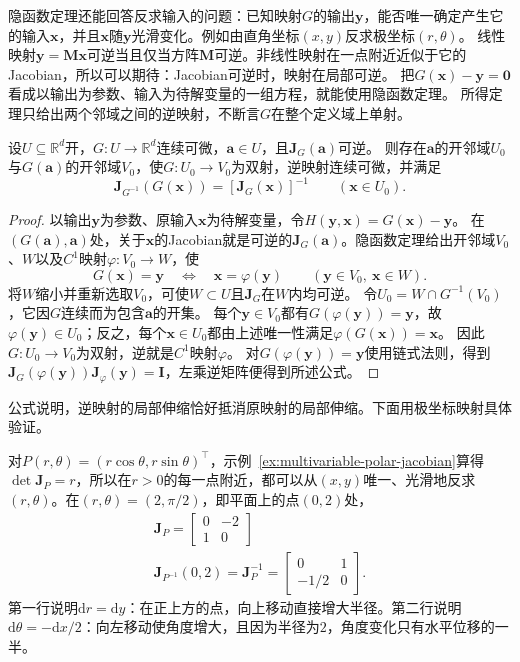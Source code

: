 隐函数定理还能回答反求输入的问题：已知映射$G$的输出$\bm y$，能否唯一确定产生它的输入$\bm x$，并且$\bm x$随$\bm y$光滑变化。例如由直角坐标$(x,y)$反求极坐标$(r,\theta)$。
线性映射$\bm y=\bm M\bm x$可逆当且仅当方阵$\bm M$可逆。非线性映射在一点附近近似于它的Jacobian，所以可以期待：Jacobian可逆时，映射在局部可逆。
把$G(\bm x)-\bm y=\bm 0$看成以输出为参数、输入为待解变量的一组方程，就能使用隐函数定理。
所得定理只给出两个邻域之间的逆映射，不断言$G$在整个定义域上单射。
\begin{theorem}[局部反函数定理]
\label{thm:multivariable-inverse-function}
设$U\subseteq\mathbb R^d$开，$G:U\to\mathbb R^d$连续可微，$\bm a\in U$，且$\bm J_G(\bm a)$可逆。
则存在$\bm a$的开邻域$U_0$与$G(\bm a)$的开邻域$V_0$，使$G:U_0\to V_0$为双射，逆映射连续可微，并满足
\[
 \bm J_{G^{-1}}(G(\bm x))=[\bm J_G(\bm x)]^{-1}
 \qquad(\bm x\in U_0).
\]
\end{theorem}
\begin{proof}
以输出$\bm y$为参数、原输入$\bm x$为待解变量，令$H(\bm y,\bm x)=G(\bm x)-\bm y$。
在$(G(\bm a),\bm a)$处，关于$\bm x$的Jacobian就是可逆的$\bm J_G(\bm a)$。隐函数定理给出开邻域$V_0$、$W$以及$C^1$映射$\varphi:V_0\to W$，使
\[
 G(\bm x)=\bm y\quad\Longleftrightarrow\quad\bm x=\varphi(\bm y)
 \qquad(\bm y\in V_0,\ \bm x\in W).
\]
将$W$缩小并重新选取$V_0$，可使$W\subset U$且$\bm J_G$在$W$内均可逆。
令$U_0=W\cap G^{-1}(V_0)$，它因$G$连续而为包含$\bm a$的开集。
每个$\bm y\in V_0$都有$G(\varphi(\bm y))=\bm y$，故$\varphi(\bm y)\in U_0$；反之，每个$\bm x\in U_0$都由上述唯一性满足$\varphi(G(\bm x))=\bm x$。
因此$G:U_0\to V_0$为双射，逆就是$C^1$映射$\varphi$。
对$G(\varphi(\bm y))=\bm y$使用链式法则，得到$\bm J_G(\varphi(\bm y))\bm J_\varphi(\bm y)=\bm I$，左乘逆矩阵便得到所述公式。
\end{proof}
公式说明，逆映射的局部伸缩恰好抵消原映射的局部伸缩。下面用极坐标映射具体验证。
\begin{example}[极坐标的局部反函数]
\label{ex:multivariable-polar-local-inverse}
对$P(r,\theta)=(r\cos\theta,r\sin\theta)^\top$，示例~\ref{ex:multivariable-polar-jacobian}算得$\det\bm J_P=r$，所以在$r>0$的每一点附近，都可以从$(x,y)$唯一、光滑地反求$(r,\theta)$。在$(r,\theta)=(2,\pi/2)$，即平面上的点$(0,2)$处，
\[
\begin{gathered}
\bm J_P=\begin{bmatrix}0&-2\\1&0\end{bmatrix}\\
\bm J_{P^{-1}}(0,2)=\bm J_P^{-1}=\begin{bmatrix}0&1\\-1/2&0\end{bmatrix}.
\end{gathered}
\]
第一行说明$\mathrm dr=\mathrm dy$：在正上方的点，向上移动直接增大半径。第二行说明$\mathrm d\theta=-\mathrm dx/2$：向左移动使角度增大，且因为半径为$2$，角度变化只有水平位移的一半。
\end{example}

